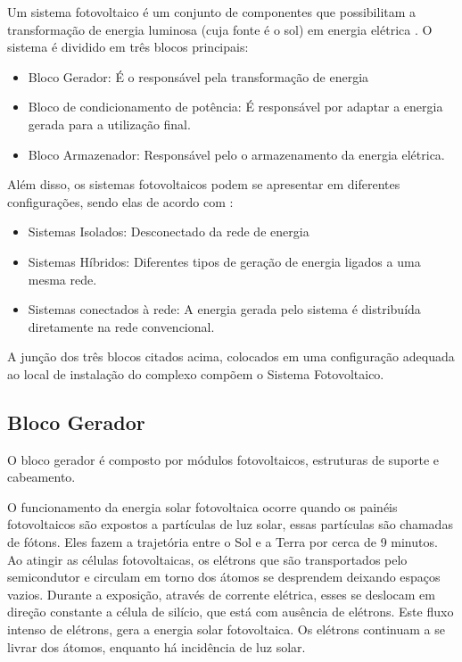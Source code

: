 Um sistema fotovoltaico é um conjunto de componentes que possibilitam a transformação de energia luminosa (cuja fonte é o sol) em energia elétrica \cite{ecycleconheca}. O sistema é dividido em três blocos principais:

\begin{itemize}
	\item Bloco Gerador: É o responsável pela transformação de energia
	\item Bloco de condicionamento de potência: É responsável por adaptar a energia gerada para a utilização final.
	\item Bloco Armazenador: Responsável pelo o armazenamento da energia elétrica.
\end{itemize}

Além disso, os sistemas fotovoltaicos podem se apresentar em diferentes configurações, sendo elas de acordo com \cite{creseb2006energia}:

\begin{itemize}
	\item Sistemas Isolados: Desconectado da rede de energia
	\item Sistemas Híbridos: Diferentes tipos de geração de energia ligados a uma mesma rede.
	\item Sistemas conectados à rede: A energia gerada pelo sistema é distribuída diretamente na rede convencional.
\end{itemize}

A junção dos três blocos citados acima, colocados em uma configuração adequada ao local de instalação do complexo compõem o Sistema Fotovoltaico. 

\subsection{Bloco Gerador}

O bloco gerador é composto por módulos fotovoltaicos, estruturas de suporte e cabeamento.

O funcionamento da energia solar fotovoltaica ocorre quando os painéis fotovoltaicos são expostos a partículas de luz solar, essas partículas são chamadas de fótons. Eles fazem a trajetória entre o Sol e a Terra por cerca de 9 minutos.  Ao atingir as células fotovoltaicas, os elétrons que são transportados pelo semicondutor e circulam em torno dos átomos se desprendem deixando espaços vazios. Durante a exposição, através de corrente elétrica, esses se deslocam em direção constante a célula de silício, que está com ausência de elétrons. Este fluxo intenso de elétrons,  gera a energia solar fotovoltaica. Os elétrons continuam a se livrar dos átomos, enquanto há incidência de luz solar.


